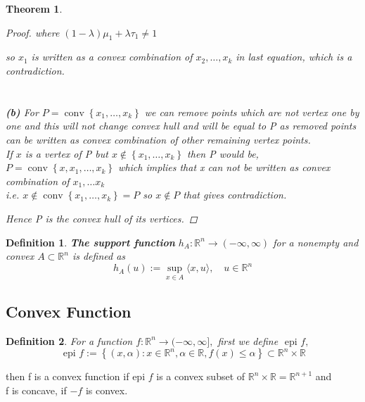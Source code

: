 \documentclass[oneside]{book}
\newtheorem{theorem}{Theorem}[section]
\newtheorem{mydef}{Definition}[section]
\begin{document}
\begin{theorem}
\begin{proof}
			where $(1-\lambda) \mu_{1}+\lambda \tau_{1} \neq 1$ \par
			so $x_{1}$ is written as a convex combination of $x_{2}, \ldots, x_{k}$ in last equation, which is  a contradiction.
			\\\\\\
			\textbf{(b)}  For $P=\operatorname{conv}\left\{x_{1}, \ldots, x_{k}\right\}$ we can remove points  which are not vertex  
			one by one and this will not change convex hull and will be equal to P as removed points can be written as convex combination of other remaining vertex points. \\
			If $x$ is a vertex of P but $x \notin \left\{x_{1}, \ldots, x_{k}\right\} $ then P would be,
			$P=\operatorname{conv}\left\{x,x_{1}, \ldots, x_{k}\right\}$ 
			which implies that x can not be written as convex combination of $x_{1}, \ldots x_{k}$ \\ i.e. 
			$x \notin  \operatorname{conv} \left\{x_{1}, \ldots, x_{k}\right\} = P  $ so $x \notin P$ that gives contradiction.\par
			Hence P is the convex hull of its vertices.
		\end{proof}
		
		
	\end{theorem}
	
	
	\begin{mydef}\label{d:8}
		\textbf{The support function }$h_{A}: \mathbb{R}^{n} \rightarrow(-\infty, \infty) $  for a nonempty and convex $A \subset \mathbb{R}^{n}$ is defined as
		$$
		h_{A}(u):=\sup _{x \in A}\langle x, u\rangle, \quad u \in \mathbb{R}^{n}
		$$
		
	\end{mydef}
	
	
	
	\subsection{Convex Function}
	\label{ss:17}
	
	
	\begin{mydef} \label{d:9}
		For a function   $f: \mathbb{R}^{n} \rightarrow(-\infty, \infty],$ first we define $\text { epi } f, $  
		\begin{equation}
		\label{eq40}
		\text { epi } f:=\left\{(x, \alpha): x \in \mathbb{R}^{n}, \alpha \in \mathbb{R}, f(x) \leq \alpha\right\} \subset \mathbb{R}^{n} \times \mathbb{R} 
		\end{equation}
	\end{mydef}
	then f is a convex function if epi $f$ is a convex subset of $\mathbb{R}^{n} \times \mathbb{R}=\mathbb{R}^{n+1}$  and \\  f is concave, if $-f$ is convex. 
	
\end{document}
